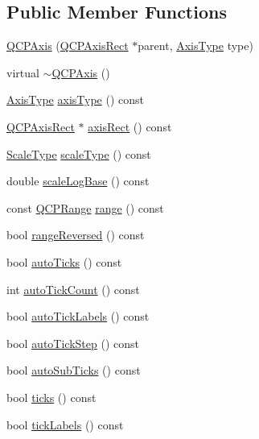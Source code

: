 \subsection*{Public Member Functions}
\begin{DoxyCompactItemize}
\item 
\hyperlink{classQCPAxis_ac62c042968bae0e6d474fcfc57c9b71f}{Q\+C\+P\+Axis} (\hyperlink{classQCPAxisRect}{Q\+C\+P\+Axis\+Rect} $\ast$parent, \hyperlink{classQCPAxis_ae2bcc1728b382f10f064612b368bc18a}{Axis\+Type} type)
\item 
virtual \hyperlink{classQCPAxis_a7cfa27ea9da0bb1fe0ae995572c0b85d}{$\sim$\+Q\+C\+P\+Axis} ()
\item 
\hyperlink{classQCPAxis_ae2bcc1728b382f10f064612b368bc18a}{Axis\+Type} \hyperlink{classQCPAxis_a593c37bf6aa4990326dc09e24f45db7f}{axis\+Type} () const 
\item 
\hyperlink{classQCPAxisRect}{Q\+C\+P\+Axis\+Rect} $\ast$ \hyperlink{classQCPAxis_aada3102af43b029e3879bcbf2bddfabb}{axis\+Rect} () const 
\item 
\hyperlink{classQCPAxis_a36d8e8658dbaa179bf2aeb973db2d6f0}{Scale\+Type} \hyperlink{classQCPAxis_a8563e13407bc0616da7f7c84e02de170}{scale\+Type} () const 
\item 
double \hyperlink{classQCPAxis_ac937d2a602f865aff2ab6c1e288739f6}{scale\+Log\+Base} () const 
\item 
const \hyperlink{classQCPRange}{Q\+C\+P\+Range} \hyperlink{classQCPAxis_ab1ea79a4f5ea4cf42620f8f51c477ac4}{range} () const 
\item 
bool \hyperlink{classQCPAxis_ade26dc7994ccd8a11f64fd83377ee021}{range\+Reversed} () const 
\item 
bool \hyperlink{classQCPAxis_afc7f20e30dc2865ff6c39f3281f330c2}{auto\+Ticks} () const 
\item 
int \hyperlink{classQCPAxis_ac87454a1342f5d2939ab59e68b4d515b}{auto\+Tick\+Count} () const 
\item 
bool \hyperlink{classQCPAxis_a7169da316ac25dec1606784152fbf2c1}{auto\+Tick\+Labels} () const 
\item 
bool \hyperlink{classQCPAxis_ae762920261b0c24beb56b893e5a2471d}{auto\+Tick\+Step} () const 
\item 
bool \hyperlink{classQCPAxis_ab9a950e16f373fe5c4b79078bb97c171}{auto\+Sub\+Ticks} () const 
\item 
bool \hyperlink{classQCPAxis_a61c504ec7c5bed9a63edf45345995d10}{ticks} () const 
\item 
bool \hyperlink{classQCPAxis_a9a78fcccd98a73d37b3d991df7b6ef1d}{tick\+Labels} () const 

\end{DoxyCompactItemize}
